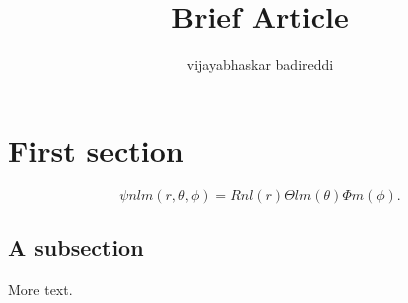 \documentclass[12pt]{article}
\title{Brief Article}
\author{vijayabhaskar badireddi}
\begin{document}

\section*{First section}
\[ψnlm(r,θ,ϕ)=Rnl(r)Θlm(θ)Φm(ϕ).\]

\subsection*{A subsection}

More text.
\end{document}

